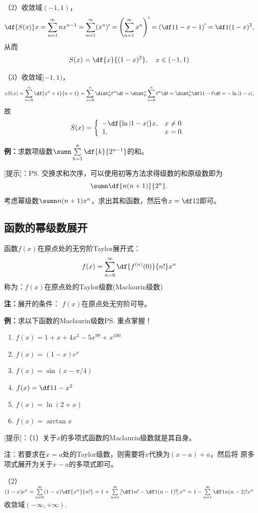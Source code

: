 （2）收敛域$(-1,1)$，
$$
	\df{S(x)}x=\sum\limits_{n=1}^{\infty}nx^{n-1}
	=\sum\limits_{n=1}^{\infty}(x^{n})'
	=\left(\sum\limits_{n=1}^{\infty}x^{n}\right)'
	=\left(\df1{1-x}-1\right)'=\df1{(1-x)^2},
$$
从而
$$S(x)=\df{x}{(1-x)^2},\quad x\in(-1,1)$$

（3）收敛域$[-1,1)$，
$$
xS(x)=\sum\limits_{n=0}^{\infty}\df{x^n+1}{n+1}
=\sum\limits_{n=0}^{\infty}\dint_0^x t^n\d t
=\dint_0^x \sum\limits_{n=0}^{\infty}t^n\d t
=\dint_0^x \df1{1-t}\d t=-\ln|1-x|,
$$
故
$$S(x)=\left\{\begin{array}{ll}
	-\df{\ln|1-x|}x,&x\ne0\\
	1,&x=0.
\end{array}\right.$$
\fin

{\bf 例：}求数项级数$\sumn\sum\limits_{k=1}^n\df{k}{2^{n-1}}$的和。

[提示]：\ps{交换求和次序，可以使用初等方法求得级数的和}原级数即为
$$\sumn\df{n(n+1)}{2^n}.$$
考虑幂级数$\sumn n(n+1)x^n$，求出其和函数，然后令$x=\df12$即可。

\subsection{函数的幂级数展开}

函数$f(x)$在原点处的无穷阶Taylor展开式：
$$f(x)=\sum\limits_{n=0}^{\infty}\df{f^{(n)}(0)}{n!}x^n$$
 称为：{\kaishu $f(x)$在原点处的Taylor级数(Maclaurin级数)}

{\bf 注：}展开的条件： $f(x)$在原点处无穷阶可导。

{\bf 例：}求以下函数的Maclaurin级数\ps{重点掌握！}

\begin{enumerate}[(1)]
  \setlength{\itemindent}{1cm}
  \item $f(x)=1+x+4x^3-5x^{99}+x^{100}$
  \item $f(x)=(1-x)e^x$
  \item $f(x)=\sin(x-\pi/4)$
  \item $f(x)=\df 1{1-x^2}$
  \item $f(x)=\ln(2+x)$
  \item $f(x)=\arctan x$
\end{enumerate}

[提示]：（1）关于$x$的多项式函数的Maclaurin级数就是其自身。

注：若要求在$x=a$处的Taylor级数，则需要将$x$代换为$(x-a)+a$，然后将
原多项式展开为关于$x-a$的多项式即可。

（2）
$(1-x)e^x=\sum\limits_{n=0}^{\infty}(1-x)\df{x^n}{n!}
=1+\sum\limits_{n=1}^{\infty}\left[\df1{n!}-\df1{(n-1)!}\right]x^n
=1-\sum\limits_{n=1}^{\infty}\df1{n(n-2)!}x^n$
收敛域$(-\infty,+\infty)$.


